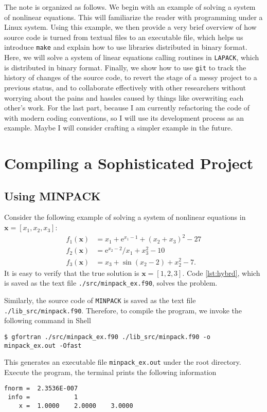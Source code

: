 \documentclass[twoside,11pt,leqno]{article}
\newcommand{\e}{\mathrm{e}}
\renewcommand{\vec}[1]{\ensuremath{\mathbf{#1}}}
\newcommand{\code}{\texttt}
\begin{document}
The note is organized as follows. We begin with an example of solving a system of nonlinear equations. This will familiarize the reader with programming under a Linux system. Using this example, we then provide a very brief overview of how source code is turned from textual files to an executable file, which helps us introduce \code{make} and explain how to use libraries distributed in binary format. Here, we will solve a system of linear equations calling routines in \code{LAPACK}, which is distributed in binary format. Finally, we show how to use \code{git} to track the history of changes of the source code, to revert the stage of a messy project to a previous status, and to collaborate effectively with other researchers without worrying about the pains and hassles caused by things like overwriting each other's work. For the last part, because I am currently refactoring the code of \citet{Azzimontietal:2014} with modern coding conventions, so I will use its development process as an example. Maybe I will consider crafting a simpler example in the future.

\section{Compiling a Sophisticated Project}

\subsection{Using MINPACK}

Consider the following example of solving a system of nonlinear equations in $\vec{x} = [x_1, x_2, x_3]$:
\begin{align*}
    f_1(\vec{x}) &= x_1 + \e^{x_1-1} + (x_2+x_3)^2 - 27 \\
    f_2(\vec{x}) &= \e^{x_2-2}/x_1 + x_3^2 - 10 \\
    f_3(\vec{x}) &= x_3 + \sin(x_2-2) + x_2^2 - 7.
\end{align*}
It is easy to verify that the true solution is $\vec{x} = [1,2,3]$. Code \ref{lst:hybrd}, which is saved as the text file \newline \code{./src/minpack\_ex.f90}, solves the problem.

Similarly, the source code of \code{MINPACK} is saved as the text file \code{./lib\_src/minpack.f90}. Therefore, to compile the program, we invoke the following command in Shell
\begin{verbatim}
$ gfortran ./src/minpack_ex.f90 ./lib_src/minpack.f90 -o minpack_ex.out -Ofast
\end{verbatim}
This generates an executable file \code{minpack\_ex.out} under the root directory. Execute the program, the terminal prints the following information
\begin{verbatim}
fnorm =  2.3536E-007
 info =            1
    x =  1.0000    2.0000    3.0000
\end{verbatim}
\end{document}
